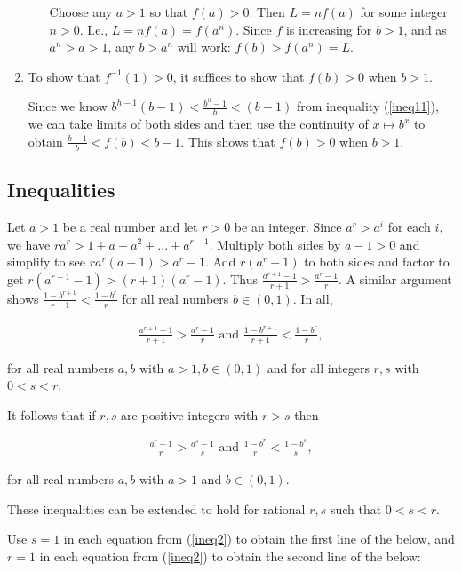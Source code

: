 \documentclass{article}
\begin{document}
\begin{enumerate}
\begin{itemize}
        Choose any $a > 1$ so that $f(a) > 0$. Then $L = nf(a)$ for some integer $n > 0$. I.e., $L = nf(a) = f(a^n)$. Since $f$ is increasing for $b > 1$, and as $a^n > a > 1$, any $b > a^n$ will work: $f(b) > f(a^n) = L$.
    \end{itemize}
    \item To show that $f^{-1}(1) > 0$, it suffices to show that $f(b) > 0$ when $b > 1$.
    
    Since we know $b^{h - 1}(b - 1) < \frac{b^h - 1}{h} < (b - 1)$ from inequality (\ref{ineq11}), we can take limits of both sides and then use the continuity of $x \mapsto b^x$ to obtain $\frac{b - 1}{b} < f(b) < b - 1$. This shows that $f(b) > 0$ when $b > 1$.
\end{enumerate}

\subsection*{Inequalities}
    
Let $a > 1$ be a real number and let $r > 0$ be an integer. Since $a^r > a^i$ for each $i$, we have ${ra^r > 1 + a + a^2 + ... + a^{r - 1}}$. Multiply both sides by $a - 1 > 0$ and simplify to see $ra^r(a - 1) > a^r - 1$. Add $r(a^r - 1)$ to both sides and factor to get $r(a^{r + 1} - 1) > (r + 1)(a^r - 1)$. Thus $\frac{a^{r + 1} - 1}{r + 1} > \frac{a^r - 1}{r}$. A similar argument shows $\frac{1 - b^{r + 1}}{r + 1} < \frac{1 - b^r}{r}$ for all real numbers $b \in (0, 1)$. In all,

\begin{align}
    \label{ineq1}
    \frac{a^{r + 1} - 1}{r + 1} > \frac{a^r - 1}{r} \text{ and } \frac{1 - b^{r + 1}}{r + 1} < \frac{1 - b^r}{r},
\end{align} 

for all real numbers $a, b$ with $a > 1, b \in (0, 1)$ and for all integers $r, s$ with $0 < s < r$.

It follows that if $r, s$ are positive integers with $r > s$ then

\begin{align}
    \label{ineq2}
    \frac{a^r - 1}{r} > \frac{a^s - 1}{s} \text{ and } \frac{1 - b^r}{r} < \frac{1 - b^s}{s},
\end{align}

for all real numbers $a, b$ with $a > 1$ and $b \in (0, 1)$. 

These inequalities can be extended to hold for rational $r, s$ such that $0 < s < r$.

Use $s = 1$ in each equation from (\ref{ineq2}) to obtain the first line of the below, and $r = 1$ in each equation from (\ref{ineq2}) to obtain the second line of the below:
\end{document}
